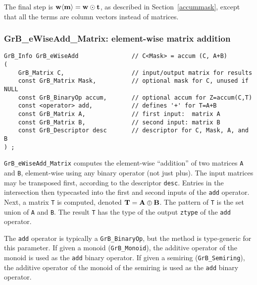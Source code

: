 \documentclass[12pt]{article}
\begin{document}
The final step is ${\bf w \langle m \rangle  = w \odot t}$, as described in
Section~\ref{accummask}, except that all the terms are column vectors instead
of matrices.

\subsubsection{{\sf GrB\_eWiseAdd\_Matrix:} element-wise matrix addition}
\label{eWiseAdd_matrix}

\begin{mdframed}[userdefinedwidth=6in]
{\footnotesize
\begin{verbatim}
GrB_Info GrB_eWiseAdd               // C<Mask> = accum (C, A+B)
(
    GrB_Matrix C,                   // input/output matrix for results
    const GrB_Matrix Mask,          // optional mask for C, unused if NULL
    const GrB_BinaryOp accum,       // optional accum for Z=accum(C,T)
    const <operator> add,           // defines '+' for T=A+B
    const GrB_Matrix A,             // first input:  matrix A
    const GrB_Matrix B,             // second input: matrix B
    const GrB_Descriptor desc       // descriptor for C, Mask, A, and B
) ;
\end{verbatim} } \end{mdframed}

\verb'GrB_eWiseAdd_Matrix' computes the element-wise ``addition'' of two
matrices \verb'A' and \verb'B', element-wise using any binary operator (not
just plus).  The input matrices may be transposed first, according to the
descriptor \verb'desc'.  Entries in the intersection then typecasted into the
first and second inputs of the \verb'add' operator.  Next, a matrix \verb'T' is
computed, denoted ${\bf T = A \oplus B}$.  The pattern of \verb'T' is the set
union of \verb'A' and \verb'B'.  The result \verb'T' has the type of the output
\verb'ztype' of the \verb'add' operator.

The \verb'add' operator is typically a \verb'GrB_BinaryOp', but the method is
type-generic for this parameter.  If given a monoid (\verb'GrB_Monoid'), the
additive operator of the monoid is used as the \verb'add' binary operator.  If
given a semiring (\verb'GrB_Semiring'), the additive operator of the monoid of
the semiring is used as the \verb'add' binary operator.
\end{document}
